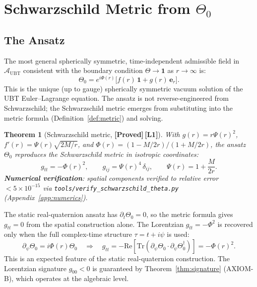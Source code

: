 \documentclass[12pt,a4paper]{article}
\newtheorem{theorem}{Theorem}[section]
\theoremstyle{definition}
\theoremstyle{remark}
\newcommand{\PROVED}{\textbf{[Proved]}}
\newcommand{\Lone}{\textbf{[L1]}}
\newcommand{\Tr}{\mathrm{Tr}}
\newcommand{\re}{\mathrm{Re}}
\newcommand{\calA}{\mathcal{A}}
\begin{document}
\section{Schwarzschild Metric from $\Theta_0$}
\label{sec:schwarzschild}

\subsection{The Ansatz}

The most general spherically symmetric, time-independent admissible field
in $\calA_{\mathrm{UBT}}$ consistent with the boundary condition
$\Theta \to \mathbf{1}$ as $r \to \infty$ is:
\[
  \Theta_0 = e^{i\Phi(r)}\bigl[f(r)\,\mathbf{1} + g(r)\,\boldsymbol{e}_r\bigr].
\]
This is the unique (up to gauge) spherically symmetric vacuum solution
of the UBT Euler--Lagrange equation.
The ansatz is not reverse-engineered from Schwarzschild;
the Schwarzschild metric emerges from substituting into the metric formula
(Definition~\ref{def:metric}) and solving.

\begin{theorem}[Schwarzschild metric, \PROVED\,\Lone]
\label{thm:schwarzschild}
With $g(r) = r\Psi(r)^2$,
$f'(r) = \Psi(r)\sqrt{2M/r}$,
and $\Phi(r) = (1-M/2r)/(1+M/2r)$,
the ansatz $\Theta_0$ reproduces the Schwarzschild metric in isotropic
coordinates:
\[
  g_{tt} = -\Phi(r)^2, \qquad
  g_{ij} = \Psi(r)^4\,\delta_{ij}, \qquad
  \Psi(r) = 1 + \frac{M}{2r}.
\]
\textbf{Numerical verification}: spatial components verified to relative
error $< 5\times 10^{-15}$ via \texttt{tools/verify\_schwarzschild\_theta.py}
(Appendix~\ref{app:numerics}).
\end{theorem}

\begin{tcolorbox}[colback=orange!5!white,colframe=orange!50!black,
  title=Limitation --- temporal component (expected, not an error)]
The static real-quaternion ansatz has $\partial_t\Theta_0 = 0$, so the metric
formula gives $g_{tt} = 0$ from the spatial construction alone.
The Lorentzian $g_{tt} = -\Phi^2$ is recovered only when the full
complex-time structure $\tau = t + i\psi$ is used:
\[
  \partial_\psi\Theta_0 = i\Phi(r)\Theta_0
  \quad\Longrightarrow\quad
  g_{tt} = -\re[\Tr(\partial_\psi\Theta_0 \cdot \partial_\psi\Theta_0^\dagger)]
          = -\Phi(r)^2.
\]
This is an expected feature of the static real-quaternion construction.
The Lorentzian signature $g_{00} < 0$ is guaranteed by
Theorem~\ref{thm:signature} (AXIOM-B), which operates at the algebraic level.
\end{tcolorbox}
\end{document}
